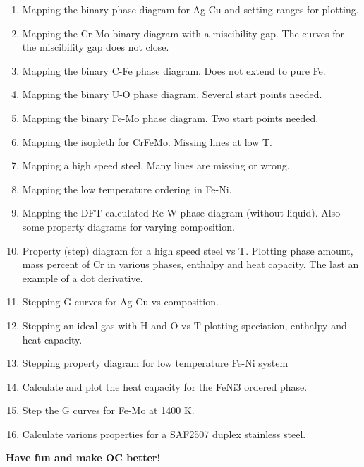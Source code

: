 \documentclass[12pt]{article}
\begin{document}
\begin{enumerate}
\item Mapping the binary phase diagram for Ag-Cu and setting ranges
  for plotting.

\item Mapping the Cr-Mo binary diagram with a miscibility gap.  The
  curves for the miscibility gap does not close.

\item Mapping the binary C-Fe phase diagram.  Does not extend to pure Fe.

\item Mapping the binary U-O phase diagram.  Several start points needed.

\item Mapping the binary Fe-Mo phase diagram.  Two start points
  needed.

\item Mapping the isopleth for CrFeMo.  Missing lines at low T.

\item Mapping a high speed steel.  Many lines are missing or wrong.

\item Mapping the low temperature ordering in Fe-Ni.

\item Mapping the DFT calculated Re-W phase diagram (without liquid).
  Also some property diagrams for varying composition.

\item Property (step) diagram for a high speed steel vs T.  Plotting
  phase amount, mass percent of Cr in various phases, enthalpy and
  heat capacity.  The last an example of a dot derivative.

\item Stepping G curves for Ag-Cu vs composition.

\item Stepping an ideal gas with H and O vs T plotting speciation,
enthalpy and heat capacity.

\item Stepping property diagram for low temperature Fe-Ni system

\item Calculate and plot the heat capacity for the FeNi3 ordered phase.

\item Step the G curves for Fe-Mo at 1400 K.

\item Calculate varions properties for a SAF2507 duplex stainless steel.

\end{enumerate}

{\large \bf Have fun and make OC better!}
\end{document}
